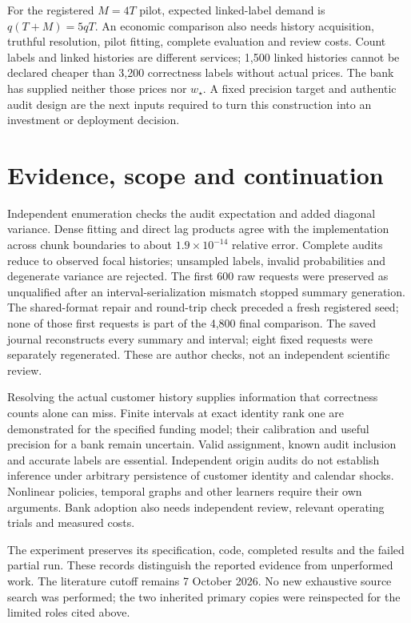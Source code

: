 For the registered $M=4T$ pilot, expected linked-label demand is $q(T+M)=5qT$.
An economic comparison also needs history acquisition, truthful resolution,
pilot fitting, complete evaluation and review costs. Count labels and linked
histories are different services; 1,500 linked histories cannot be declared
cheaper than 3,200 correctness labels without actual prices. The bank has
supplied neither those prices nor $w_\star$. A fixed precision target and
authentic audit design are the next inputs required to turn this construction
into an investment or deployment decision.

\section*{Evidence, scope and continuation}

Independent enumeration checks the audit expectation and added diagonal
variance. Dense fitting and direct lag products agree with the implementation
across chunk boundaries to about $1.9\times10^{-14}$ relative error. Complete
audits reduce to observed focal histories; unsampled labels, invalid
probabilities and degenerate variance are rejected. The first 600 raw requests
were preserved as unqualified after an interval-serialization mismatch stopped
summary generation. The shared-format repair and round-trip check preceded a
fresh registered seed; none of those first requests is part of the 4,800 final
comparison. The saved journal reconstructs every summary and interval; eight
fixed requests were separately regenerated. These are author checks, not an
independent scientific review.

Resolving the actual customer history supplies information that
correctness counts alone can miss. Finite intervals at exact identity rank
one are demonstrated for the specified funding model; their calibration and
useful precision for a bank remain uncertain. Valid assignment, known audit
inclusion and accurate labels are essential. Independent origin audits do
not establish inference under arbitrary persistence of customer identity and
calendar shocks. Nonlinear policies, temporal graphs and other learners
require their own arguments. Bank adoption also needs independent review,
relevant operating trials and measured costs.

The experiment preserves its specification, code, completed results
and the failed partial run. These records distinguish the reported evidence
from unperformed work. The literature cutoff remains 7 October 2026. No new exhaustive source search
was performed; the two inherited primary copies were reinspected for the
limited roles cited above.
